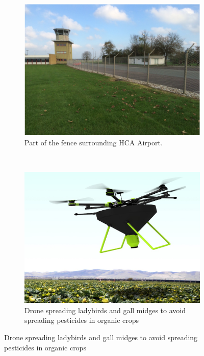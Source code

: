 \begin{figure}[H]
    \centering
    \begin{subfigure}[b]{0.45\textwidth}
        \includegraphics[width=\textwidth]{graphics/hca_fence.png}
        \caption{Part of the fence surrounding HCA Airport.}
        \label{fig:hca_fence}
    \end{subfigure}
        ~  %
    \begin{subfigure}[b]{0.45\textwidth}
        \includegraphics[width=\textwidth]{graphics/organicdrone.png}
        \caption{Drone spreading ladybirds and gall midges to avoid spreading pesticides in organic crops}
        \label{fig:organicdrone}
    \end{subfigure}
   \label{fig:sdu_projects}
\end{figure}

